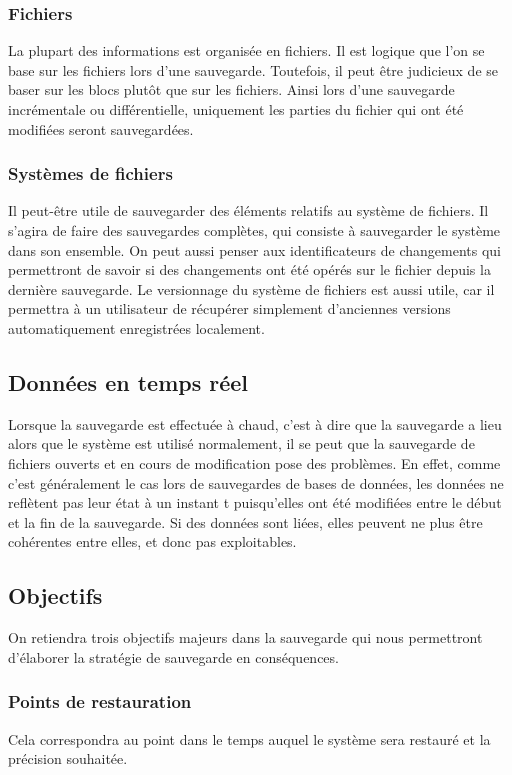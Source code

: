 \documentclass[a4paper,11pt]{report}
\begin{document}
\subsubsection{Fichiers}
La plupart des informations est organisée en fichiers. 
Il est logique que l'on se base sur les fichiers lors d'une sauvegarde.
Toutefois, il peut être judicieux de se baser sur les blocs plutôt que sur les fichiers.
Ainsi lors d'une sauvegarde incrémentale ou différentielle, uniquement les parties du fichier qui ont été modifiées seront sauvegardées.

\subsubsection{Systèmes de fichiers}
Il peut-être utile de sauvegarder des éléments relatifs au système de fichiers.
Il s'agira de faire des sauvegardes complètes, qui consiste à sauvegarder le système dans son ensemble.
On peut aussi penser aux identificateurs de changements qui permettront de savoir si des changements ont été opérés sur le fichier depuis la dernière sauvegarde.
Le versionnage du système de fichiers est aussi utile, car il permettra à un utilisateur de récupérer simplement d'anciennes versions automatiquement enregistrées localement.

\subsection{Données en temps réel}
Lorsque la sauvegarde est effectuée à chaud, c'est à dire que la sauvegarde a lieu alors que le système est utilisé normalement, il se peut que la sauvegarde de fichiers ouverts et en cours de modification pose des problèmes.
En effet, comme c'est généralement le cas lors de sauvegardes de bases de données, les données ne reflètent pas leur état à un instant t puisqu'elles ont été modifiées entre le début et la fin de la sauvegarde.
Si des données sont liées, elles peuvent ne plus être cohérentes entre elles, et donc pas exploitables.  

\subsection{Objectifs}
On retiendra trois objectifs majeurs dans la sauvegarde qui nous permettront d'élaborer la stratégie de sauvegarde en conséquences.

\subsubsection{Points de restauration}
Cela correspondra au point dans le temps auquel le système sera restauré et la précision souhaitée.
\end{document}
